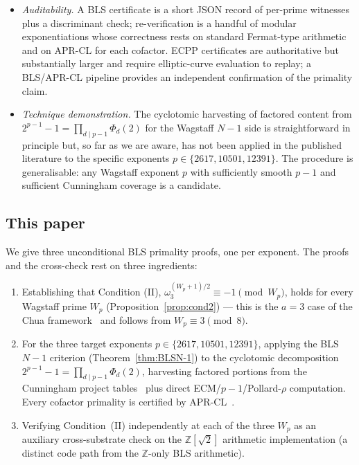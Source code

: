 \documentclass[11pt,a4paper]{amsart}
\theoremstyle{plain}
\theoremstyle{definition}
\newcommand{\Z}{\mathbb{Z}}
\newcommand{\wom}{\omega_3}
\newcommand{\sqrttwo}{\sqrt{2}}
\begin{document}
\begin{itemize}
\item \emph{Auditability.} A BLS certificate is a short JSON record of
  per-prime witnesses plus a discriminant check; re-verification is a
  handful of modular exponentiations whose correctness rests on standard
  Fermat-type arithmetic and on APR-CL for each cofactor. ECPP
  certificates are authoritative but substantially larger and require
  elliptic-curve evaluation to replay; a BLS/APR-CL pipeline provides an
  independent confirmation of the primality claim.
\item \emph{Technique demonstration.} The cyclotomic harvesting of
  factored content from $2^{p-1} - 1 = \prod_{d \mid p - 1} \Phi_d(2)$
  for the Wagstaff $N - 1$ side is straightforward in principle but, so
  far as we are aware, has not been applied in the published literature
  to the specific exponents $p \in \{2617, 10501, 12391\}$. The
  procedure is generalisable: any Wagstaff exponent $p$ with
  sufficiently smooth $p - 1$ and sufficient Cunningham coverage is a
  candidate.
\end{itemize}

\subsection{This paper}

We give three unconditional BLS primality proofs, one per exponent.
The proofs and the cross-check rest on three ingredients:
\begin{enumerate}
\item Establishing that Condition (II),
  $\wom^{(W_p+1)/2} \equiv -1 \pmod{W_p}$, holds for every Wagstaff
  prime $W_p$ (Proposition~\ref{prop:cond2}) --- this is the
  $a = 3$ case of the Chua framework~\cite{Chua} and follows from
  $W_p \equiv 3 \pmod{8}$.
\item For the three target exponents $p \in \{2617, 10501, 12391\}$,
  applying the BLS $N - 1$ criterion (Theorem~\ref{thm:BLSN-1}) to the
  cyclotomic decomposition $2^{p-1} - 1 = \prod_{d \mid p - 1}
  \Phi_d(2)$, harvesting factored portions from the Cunningham project
  tables~\cite{Cunningham} plus direct ECM/$p{-}1$/Pollard-$\rho$
  computation. Every cofactor primality is certified by
  APR-CL~\cite{APR,CohenLenstraAlgo}.
\item Verifying Condition~(II) independently at each of the three
  $W_p$ as an auxiliary cross-substrate check on the
  $\Z[\sqrttwo]$ arithmetic implementation (a distinct code path
  from the $\Z$-only BLS arithmetic).
\end{enumerate}
\end{document}
